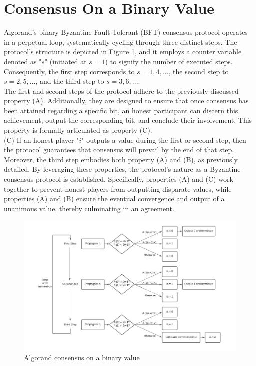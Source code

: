 \documentclass{report}
\begin{document}
\section{Consensus On a Binary Value}
Algorand's binary Byzantine Fault Tolerant (BFT) consensus protocol operates in a perpetual loop, systematically cycling through three distinct steps. The protocol's structure is depicted in Figure \ref{fig:f4}, and it employs a counter variable denoted as "$s$" (initiated at $s = 1$) to signify the number of executed steps. Consequently, the first step corresponds to $s = 1, 4, ...$, the second step to $s = 2, 5, ...$, and the third step to $s = 3, 6, ...$.\\
The first and second steps of the protocol adhere to the previously discussed property (A). Additionally, they are designed to ensure that once consensus has been attained regarding a specific bit, an honest participant can discern this achievement, output the corresponding bit, and conclude their involvement. This property is formally articulated as property (C).\\
(C) If an honest player "$i$" outputs a value during the first or second step, then the protocol guarantees that consensus will prevail by the end of that step. Moreover, the third step embodies both property (A) and (B), as previously detailed. By leveraging these properties, the protocol's nature as a Byzantine consensus protocol is established. Specifically, properties (A) and (C) work together to prevent honest players from outputting disparate values, while properties (A) and (B) ensure the eventual convergence and output of a unanimous value, thereby culminating in an agreement.
\begin{center}
	\begin{figure}
		\centering
		\includegraphics[width=0.8\linewidth]{Fig/F4}
		\caption{Algorand consensus on a binary value}
		\label{fig:f4}
	\end{figure}
\end{center}
\end{document}

